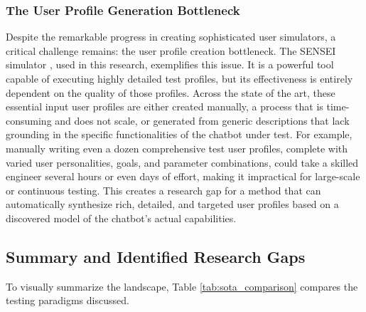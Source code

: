 \subsubsection{The User Profile Generation Bottleneck}
Despite the remarkable progress in creating sophisticated user simulators,
a critical challenge remains:
the user profile creation bottleneck.
The SENSEI simulator \autocite{delaraAutomatedEndtoEndTesting2025, delaraSensei},
used in this research, exemplifies this issue.
It is a powerful tool capable of executing highly detailed test profiles,
but its effectiveness is entirely dependent on the quality of those profiles.
Across the state of the art,
these essential input user profiles are either created manually,
a process that is time-consuming and does not scale,
or generated from generic descriptions
that lack grounding in the specific functionalities of the chatbot under test.
For example, manually writing even a dozen comprehensive test user profiles,
complete with varied user personalities, goals, and parameter combinations,
could take a skilled engineer several hours or even days of effort,
making it impractical for large-scale or continuous testing.
This creates a research gap
for a method that can automatically synthesize
rich, detailed, and targeted user profiles
based on a discovered model of the chatbot's actual capabilities.

\subsection{Summary and Identified Research Gaps}

To visually summarize the landscape,
Table \ref{tab:sota_comparison}
compares the testing paradigms discussed.

\begin{table}[h!]
\centering
\caption{Comparison of State-of-the-Art Chatbot Testing Paradigms}
\label{tab:sota_comparison}
\end{table}

